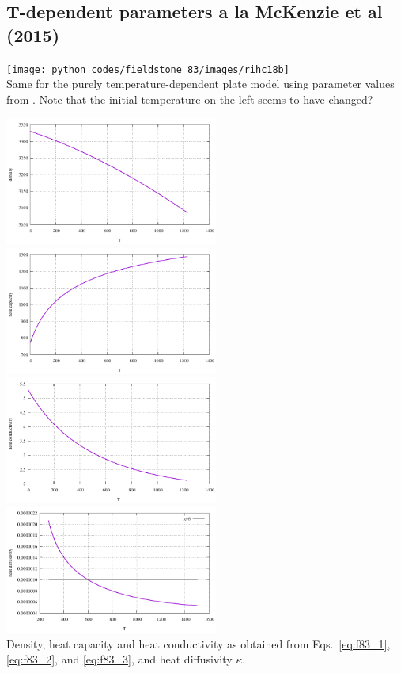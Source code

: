 \subsection*{T-dependent parameters a la McKenzie et al (2015)}

\begin{center}
\texttt{[image: python\_codes/fieldstone\_83/images/rihc18b]}\\
{\captionfont Same for the purely temperature-dependent plate model using parameter values from
\textcite{mcjp05}. Note that the initial temperature on the left seems to have changed?}
\end{center}


\begin{center}
\includegraphics[width=7cm]{python_codes/fieldstone_83/results_model2/rho.pdf}
\includegraphics[width=7cm]{python_codes/fieldstone_83/results_model2/hcapa.pdf}\\
\includegraphics[width=7cm]{python_codes/fieldstone_83/results_model2/hcond.pdf}
\includegraphics[width=7cm]{python_codes/fieldstone_83/results_model2/kappa.pdf}\\
{\captionfont Density, heat capacity and heat conductivity as obtained from Eqs.~\eqref{eq:f83_1}, 
\eqref{eq:f83_2}, and \eqref{eq:f83_3}, and heat diffusivity $\kappa$.}
\end{center}

